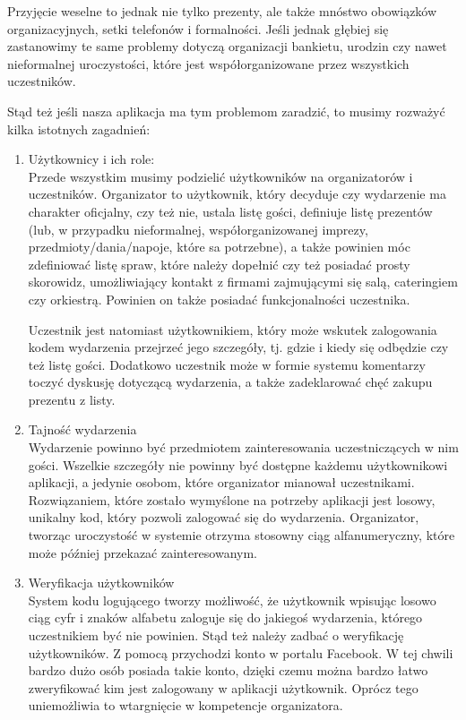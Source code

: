 \documentclass[12pt,titlepage]{article}
\begin{document}
Przyjęcie weselne to jednak nie tylko prezenty, ale także mnóstwo obowiązków organizacyjnych, setki telefonów i formalności. Jeśli jednak głębiej się zastanowimy
te same problemy dotyczą organizacji bankietu, urodzin czy nawet nieformalnej uroczystości, które jest współorganizowane przez wszystkich uczestników.

Stąd też jeśli nasza aplikacja ma tym problemom zaradzić, to musimy rozważyć kilka istotnych zagadnień:

\begin{enumerate}
 \item Użytkownicy i ich role:
 \\ Przede wszystkim musimy podzielić użytkowników na organizatorów i uczestników.
 Organizator to użytkownik, który decyduje czy wydarzenie ma charakter oficjalny, czy też nie, ustala listę gości, definiuje listę prezentów (lub, w przypadku
 nieformalnej, współorganizowanej imprezy, przedmioty/dania/napoje, które sa potrzebne), a także powinien móc zdefiniować listę spraw, które należy dopełnić czy też
 posiadać prosty skorowidz, umożliwiający kontakt z firmami zajmującymi się salą, cateringiem czy orkiestrą. Powinien on także posiadać funkcjonalności uczestnika.
 
 Uczestnik jest natomiast użytkownikiem, który może wskutek zalogowania kodem wydarzenia przejrzeć jego szczegóły, tj. gdzie i kiedy się odbędzie czy też listę gości.
 Dodatkowo uczestnik może w formie systemu komentarzy toczyć dyskusję dotyczącą wydarzenia, a także zadeklarować chęć zakupu prezentu z listy.
 
 \item Tajność wydarzenia
 \\ Wydarzenie powinno być przedmiotem zainteresowania uczestniczących w nim gości. Wszelkie szczegóły nie powinny być dostępne każdemu użytkownikowi aplikacji, a jedynie
 osobom, które organizator mianował uczestnikami. Rozwiązaniem, które zostało wymyślone na potrzeby aplikacji jest losowy, unikalny kod, który pozwoli zalogować się do
 wydarzenia. Organizator, tworząc uroczystość w systemie otrzyma stosowny ciąg alfanumeryczny, które może później przekazać zainteresowanym.
 
 
 \item Weryfikacja użytkowników
 \\ System kodu logującego tworzy możliwość, że użytkownik wpisując losowo ciąg cyfr i znaków alfabetu zaloguje się do jakiegoś wydarzenia, którego uczestnikiem być nie powinien.
 Stąd też należy zadbać o weryfikację użytkowników. Z pomocą przychodzi konto w portalu Facebook. W tej chwili bardzo dużo osób posiada takie konto, dzięki czemu można bardzo łatwo
 zweryfikować kim jest zalogowany w aplikacji użytkownik.
 Oprócz tego uniemożliwia to wtargnięcie w kompetencje organizatora.
 

\end{enumerate}
\end{document}
